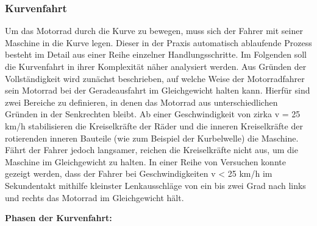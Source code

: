 \subsubsection{Kurvenfahrt} \cite{Haedrich2012} %
Um das Motorrad durch die Kurve zu bewegen, muss sich der Fahrer mit seiner Maschine in die Kurve legen. Dieser in der Praxis automatisch ablaufende Prozess besteht im Detail aus einer Reihe einzelner Handlungsschritte. Im Folgenden soll die Kurvenfahrt in ihrer Komplexität näher analysiert werden. Aus Gründen der Vollständigkeit wird zunächst beschrieben, auf welche Weise der Motorradfahrer sein Motorrad bei der Geradeausfahrt im Gleichgewicht halten kann. Hierfür sind zwei Bereiche zu definieren, in denen das Motorrad aus unterschiedlichen Gründen in der Senkrechten bleibt. Ab einer Geschwindigkeit von zirka v = 25 km/h stabilisieren die Kreiselkräfte der Räder und die inneren Kreiselkräfte der rotierenden inneren Bauteile (wie zum Beispiel der Kurbelwelle) die Maschine. Fährt der Fahrer jedoch langsamer, reichen die Kreiselkräfte nicht aus, um die Maschine im Gleichgewicht zu halten. In einer Reihe von Versuchen konnte gezeigt werden, dass der Fahrer bei Geschwindigkeiten v < 25 km/h im Sekundentakt mithilfe kleinster Lenkausschläge von ein bis zwei Grad nach links und rechts das Motorrad im Gleichgewicht hält.

\textbf{Phasen der Kurvenfahrt:}\\

